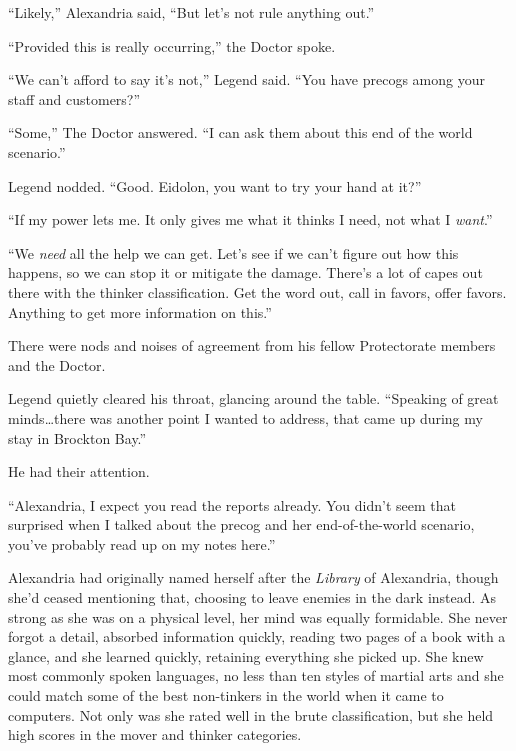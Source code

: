``Likely,'' Alexandria said, ``But let's not rule anything out.''



``Provided this is really occurring,'' the Doctor spoke.



``We can't afford to say it's not,'' Legend said.  ``You have precogs among your staff and customers?''



``Some,'' The Doctor answered.  ``I can ask them about this end of the world scenario.''



Legend nodded.  ``Good.  Eidolon, you want to try your hand at it?''



``If my power lets me.  It only gives me what it thinks I need, not what I \emph{want}.''



``We \emph{need} all the help we can get.  Let's see if we can't figure out how this happens, so we can stop it or mitigate the damage.  There's a lot of capes out there with the thinker classification.  Get the word out, call in favors, offer favors.  Anything to get more information on this.''



There were nods and noises of agreement from his fellow Protectorate members and the Doctor.



Legend quietly cleared his throat, glancing around the table.  ``Speaking of great minds\ldots there was another point I wanted to address, that came up during my stay in Brockton Bay.''



He had their attention.



``Alexandria, I expect you read the reports already.  You didn't seem that surprised when I talked about the precog and her end-of-the-world scenario, you've probably read up on my notes here.''



Alexandria had originally named herself after the \emph{Library} of Alexandria, though she'd ceased mentioning that, choosing to leave enemies in the dark instead.  As strong as she was on a physical level, her mind was equally formidable.  She never forgot a detail, absorbed information quickly, reading two pages of a book with a glance, and she learned quickly, retaining everything she picked up.  She knew most commonly spoken languages, no less than ten styles of martial arts and she could match some of the best non-tinkers in the world when it came to computers.  Not only was she rated well in the brute classification, but she held high scores in the mover and thinker categories.




